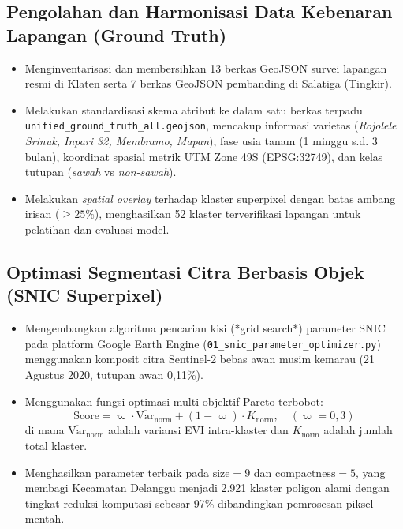 \documentclass[11pt,a4paper]{article}
\begin{document}
\subsection{Pengolahan dan Harmonisasi Data Kebenaran Lapangan (Ground Truth)}
\begin{itemize}
    \item Menginventarisasi dan membersihkan 13 berkas GeoJSON survei lapangan resmi di Klaten serta 7 berkas GeoJSON pembanding di Salatiga (Tingkir).
    \item Melakukan standardisasi skema atribut ke dalam satu berkas terpadu \texttt{unified\_ground\_truth\_all.geojson}, mencakup informasi varietas (\textit{Rojolele Srinuk, Inpari 32, Membramo, Mapan}), fase usia tanam (1 minggu s.d. 3 bulan), koordinat spasial metrik UTM Zone 49S (EPSG:32749), dan kelas tutupan (\textit{sawah} vs \textit{non-sawah}).
    \item Melakukan \textit{spatial overlay} terhadap klaster superpixel dengan batas ambang irisan ($\ge 25\%$), menghasilkan 52 klaster terverifikasi lapangan untuk pelatihan dan evaluasi model.
\end{itemize}

\subsection{Optimasi Segmentasi Citra Berbasis Objek (SNIC Superpixel)}
\begin{itemize}
    \item Mengembangkan algoritma pencarian kisi (*grid search*) parameter SNIC pada platform Google Earth Engine (\texttt{01\_snic\_parameter\_optimizer.py}) menggunakan komposit citra Sentinel-2 bebas awan musim kemarau (21 Agustus 2020, tutupan awan 0{,}11\%).
    \item Menggunakan fungsi optimasi multi-objektif Pareto terbobot:
    \begin{equation}
        \text{Score} = \varpi \cdot \overline{\text{Var}}_{\text{norm}} + (1 - \varpi) \cdot K_{\text{norm}}, \quad (\varpi = 0{,}3)
    \end{equation}
    di mana $\overline{\text{Var}}_{\text{norm}}$ adalah variansi EVI intra-klaster dan $K_{\text{norm}}$ adalah jumlah total klaster.
    \item Menghasilkan parameter terbaik pada $\text{size} = 9$ dan $\text{compactness} = 5$, yang membagi Kecamatan Delanggu menjadi 2.921 klaster poligon alami dengan tingkat reduksi komputasi sebesar 97\% dibandingkan pemrosesan piksel mentah.
\end{itemize}
\end{document}
